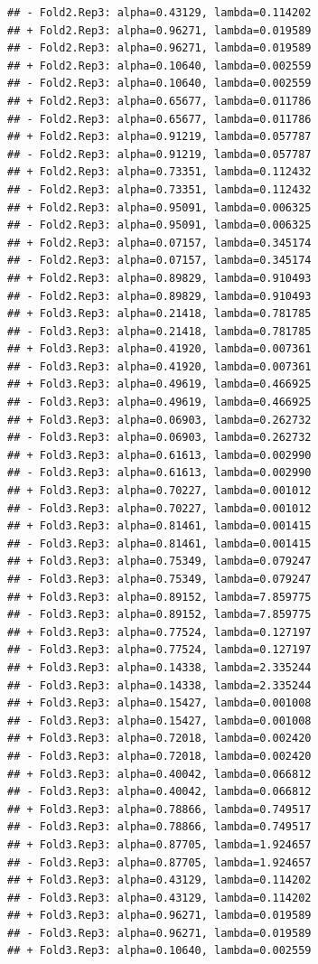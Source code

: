 \documentclass[
]{article}
\begin{document}
\begin{verbatim}
## - Fold2.Rep3: alpha=0.43129, lambda=0.114202 
## + Fold2.Rep3: alpha=0.96271, lambda=0.019589 
## - Fold2.Rep3: alpha=0.96271, lambda=0.019589 
## + Fold2.Rep3: alpha=0.10640, lambda=0.002559 
## - Fold2.Rep3: alpha=0.10640, lambda=0.002559 
## + Fold2.Rep3: alpha=0.65677, lambda=0.011786 
## - Fold2.Rep3: alpha=0.65677, lambda=0.011786 
## + Fold2.Rep3: alpha=0.91219, lambda=0.057787 
## - Fold2.Rep3: alpha=0.91219, lambda=0.057787 
## + Fold2.Rep3: alpha=0.73351, lambda=0.112432 
## - Fold2.Rep3: alpha=0.73351, lambda=0.112432 
## + Fold2.Rep3: alpha=0.95091, lambda=0.006325 
## - Fold2.Rep3: alpha=0.95091, lambda=0.006325 
## + Fold2.Rep3: alpha=0.07157, lambda=0.345174 
## - Fold2.Rep3: alpha=0.07157, lambda=0.345174 
## + Fold2.Rep3: alpha=0.89829, lambda=0.910493 
## - Fold2.Rep3: alpha=0.89829, lambda=0.910493 
## + Fold3.Rep3: alpha=0.21418, lambda=0.781785 
## - Fold3.Rep3: alpha=0.21418, lambda=0.781785 
## + Fold3.Rep3: alpha=0.41920, lambda=0.007361 
## - Fold3.Rep3: alpha=0.41920, lambda=0.007361 
## + Fold3.Rep3: alpha=0.49619, lambda=0.466925 
## - Fold3.Rep3: alpha=0.49619, lambda=0.466925 
## + Fold3.Rep3: alpha=0.06903, lambda=0.262732 
## - Fold3.Rep3: alpha=0.06903, lambda=0.262732 
## + Fold3.Rep3: alpha=0.61613, lambda=0.002990 
## - Fold3.Rep3: alpha=0.61613, lambda=0.002990 
## + Fold3.Rep3: alpha=0.70227, lambda=0.001012 
## - Fold3.Rep3: alpha=0.70227, lambda=0.001012 
## + Fold3.Rep3: alpha=0.81461, lambda=0.001415 
## - Fold3.Rep3: alpha=0.81461, lambda=0.001415 
## + Fold3.Rep3: alpha=0.75349, lambda=0.079247 
## - Fold3.Rep3: alpha=0.75349, lambda=0.079247 
## + Fold3.Rep3: alpha=0.89152, lambda=7.859775 
## - Fold3.Rep3: alpha=0.89152, lambda=7.859775 
## + Fold3.Rep3: alpha=0.77524, lambda=0.127197 
## - Fold3.Rep3: alpha=0.77524, lambda=0.127197 
## + Fold3.Rep3: alpha=0.14338, lambda=2.335244 
## - Fold3.Rep3: alpha=0.14338, lambda=2.335244 
## + Fold3.Rep3: alpha=0.15427, lambda=0.001008 
## - Fold3.Rep3: alpha=0.15427, lambda=0.001008 
## + Fold3.Rep3: alpha=0.72018, lambda=0.002420 
## - Fold3.Rep3: alpha=0.72018, lambda=0.002420 
## + Fold3.Rep3: alpha=0.40042, lambda=0.066812 
## - Fold3.Rep3: alpha=0.40042, lambda=0.066812 
## + Fold3.Rep3: alpha=0.78866, lambda=0.749517 
## - Fold3.Rep3: alpha=0.78866, lambda=0.749517 
## + Fold3.Rep3: alpha=0.87705, lambda=1.924657 
## - Fold3.Rep3: alpha=0.87705, lambda=1.924657 
## + Fold3.Rep3: alpha=0.43129, lambda=0.114202 
## - Fold3.Rep3: alpha=0.43129, lambda=0.114202 
## + Fold3.Rep3: alpha=0.96271, lambda=0.019589 
## - Fold3.Rep3: alpha=0.96271, lambda=0.019589 
## + Fold3.Rep3: alpha=0.10640, lambda=0.002559 

\end{verbatim}
\end{document}

